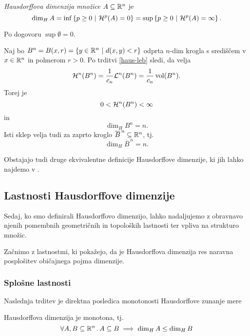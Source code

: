 \begin{definicija}
    \emph{Hausdorffova dimenzija množice \(A \subseteq \mathbb{R}^n\)} je 
    \[\dim_H A = \inf \left\{p \geq 0 \ | \ \mathcal{H}^{p}(A) = 0\right\} = \sup \left\{p \geq 0 \ | \ \mathcal{H}^{p}(A) = \infty\right\}.\]
\end{definicija}

\begin{opomba} 
    Po dogovoru \(\sup \emptyset = 0\).
\end{opomba}

\begin{zgled}
    \label{dim-ball}
    Naj bo \(B^n = B(x, r) = \left\{y \in \mathbb{R}^n \ | \ d(x, y) < r\right\}\) odprta \(n\)-dim krogla s središčem v \(x \in \mathbb{R}^n\) in polmerom \(r > 0\). Po trditvi \ref{haus-leb} sledi, da velja
    \[\mathcal{H}^n(B^n) = \frac{1}{c_n} \mathcal{L}^n(B^n) = \frac{1}{c_n} \operatorname{vol}(B^n).\]
    Torej je 
    \[0 < \mathcal{H}^n(B^n) < \infty\]
    in 
    \[\dim_H B^n = n.\]
    Isti sklep velja tudi za zaprto kroglo \(\overline{B}^{\, n} \subseteq \mathbb{R}^n\), tj.
    \[\dim_H \overline{B}^{\, n} = n.\]
\end{zgled}

\begin{opomba}
    Obstajajo tudi druge ekvivalentne definicije Hausdorffove dimenzije, ki jih lahko najdemo v \cite{fk-fg}.
\end{opomba}

\subsection{Lastnosti Hausdorffove dimenzije}
Sedaj, ko smo definirali Hausdorffovo dimenzijo, lahko nadaljujemo z obravnavo njenih pomembnih geometričnih in topoloških lastnosti ter vpliva na strukturo množic.

Začnimo z lastnostmi, ki pokažejo, da je Hausdorffova dimenzija res naravna posplošitev običajnega pojma dimenzije.

\subsubsection{Splošne lastnosti}
Naslednja trditev je direktna posledica monotonosti Hausdorffove zunanje mere 

\begin{trditev}[Monotonost]
    \label{haus-monotonost}
    Hausdorffova dimenzija je monotona, tj.
    \[\forall A, B \subseteq \mathbb{R}^n \,.\, A \subseteq B \implies \dim_H A \leq \dim_H B\]
\end{trditev}

